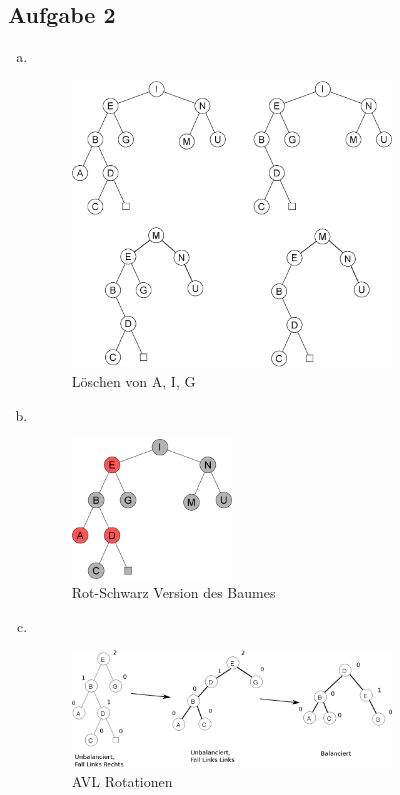 \documentclass[11pt]{article}
\begin{document}
\subsection*{Aufgabe 2}
\begin{enumerate}[a)]
  \item $ $
    \begin{figure}[h!]
      \centering
      \includegraphics[width=0.8\textwidth]{avl_search_tree_delete}
      \caption{Löschen von A, I, G}
    \end{figure}
    
\newpage
    
  \item $ $

    \begin{figure}[h!]
      \centering
      \includegraphics[width=0.4\textwidth]{avl_search_tree_red_black}
      \caption{Rot-Schwarz Version des Baumes}
    \end{figure}
    
  \item $ $

    \begin{figure}[h!]
      \centering
      \includegraphics[width=0.8\textwidth]{avl_search_tree_rotate}
      \caption{AVL Rotationen}
    \end{figure}
    
\end{enumerate} 
\end{document}

